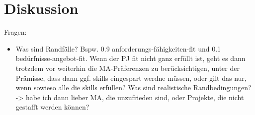 
\chapter{Diskussion}
\label{ch:diskussion}

Fragen:
\begin{itemize}
    \item Was sind Randfälle? Bspw. 0.9 anforderungs-fähigkeiten-fit und 0.1 bedürfnisse-angebot-fit. Wenn der PJ fit nicht ganz erfüllt ist, geht es dann trotzdem vor weiterhin die MA-Präferenzen zu berücksichtigen, unter der Prämisse, dass dann ggf. skills eingespart werdne müssen, oder gilt das nur, wenn sowieso alle die skills erfüllen? Was sind realistische Randbedingungen? -> habe ich dann lieber MA, die unzufrieden sind, oder Projekte, die nicht gestafft werden können?
\end{itemize}

